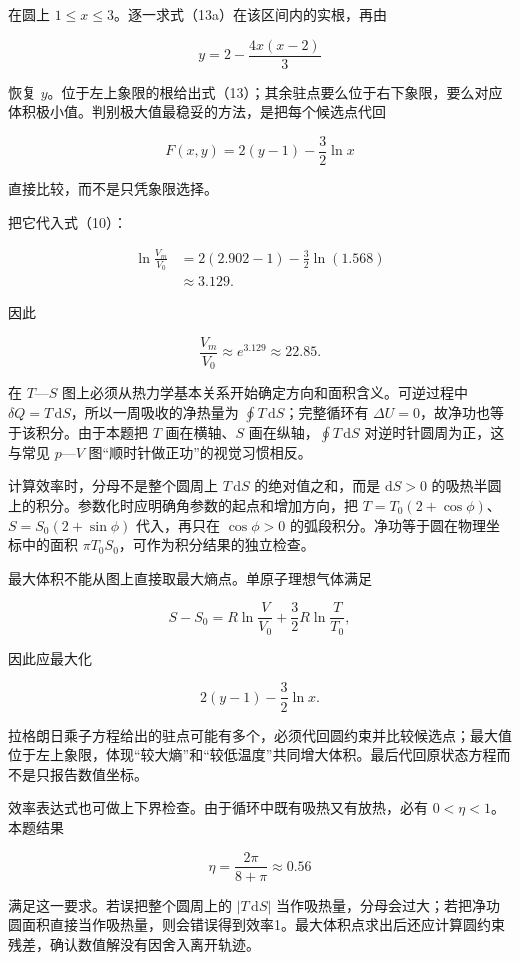 \documentclass[12pt,a4paper,UTF8]{ctexart}
\begin{document}
在圆上 \(1\leq x\leq3\)。逐一求式（13a）在该区间内的实根，再由

\[y=2-\frac{4x(x-2)}{3}\]

恢复
\(y\)。位于左上象限的根给出式（13）；其余驻点要么位于右下象限，要么对应体积极小值。判别极大值最稳妥的方法，是把每个候选点代回

\[F(x,y)=2(y-1)-\frac32\ln x\]

直接比较，而不是只凭象限选择。

把它代入式（10）：

\[\begin{aligned}
\ln\frac{V_m}{V_0}
&=2(2.902-1)-\frac32\ln(1.568)\\
&\approx3.129.
\end{aligned}\]

因此

\[\boxed{\frac{V_m}{V_0}\approx e^{3.129}\approx22.85}. \tag{14}\]

在 \(T\)---\(S\)
图上必须从热力学基本关系开始确定方向和面积含义。可逆过程中
\(\delta Q=T\,\mathrm dS\)，所以一周吸收的净热量为
\(\oint T\,\mathrm dS\)；完整循环有
\(\Delta U=0\)，故净功也等于该积分。由于本题把 \(T\) 画在横轴、\(S\)
画在纵轴，\(\oint T\,\mathrm dS\) 对逆时针圆周为正，这与常见
\(p\)---\(V\) 图``顺时针做正功''的视觉习惯相反。

计算效率时，分母不是整个圆周上 \(T\,\mathrm dS\) 的绝对值之和，而是
\(\mathrm dS>0\)
的吸热半圆上的积分。参数化时应明确角参数的起点和增加方向，把
\(T=T_0(2+\cos\phi)\)、\(S=S_0(2+\sin\phi)\) 代入，再只在 \(\cos\phi>0\)
的弧段积分。净功等于圆在物理坐标中的面积
\(\pi T_0S_0\)，可作为积分结果的独立检查。

最大体积不能从图上直接取最大熵点。单原子理想气体满足

\[S-S_0=R\ln\frac{V}{V_0}+\frac32R\ln\frac{T}{T_0},\]

因此应最大化

\[2(y-1)-\frac32\ln x.\]

拉格朗日乘子方程给出的驻点可能有多个，必须代回圆约束并比较候选点；最大值位于左上象限，体现``较大熵''和``较低温度''共同增大体积。最后代回原状态方程而不是只报告数值坐标。

效率表达式也可做上下界检查。由于循环中既有吸热又有放热，必有
\(0<\eta<1\)。本题结果

\[\eta=\frac{2\pi}{8+\pi}\approx0.56\]

满足这一要求。若误把整个圆周上的 \(|T\,\mathrm dS|\)
当作吸热量，分母会过大；若把净功圆面积直接当作吸热量，则会错误得到效率1。最大体积点求出后还应计算圆约束残差，确认数值解没有因舍入离开轨迹。
\end{document}
